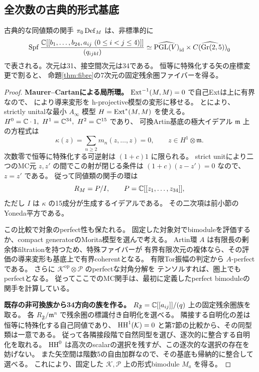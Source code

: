 \subsection{全次数の古典的形式基底}

\begin{theorem}[固定した両ブロック間の全形式gluing変形]\label{thm:full-gluing-base}
古典的な同値類の関手 $\pi_0\operatorname{Def}_M$ は、非標準的に
\[
 \operatorname{Spf}
 \frac{\mathbb C[[b_1,\ldots,b_{24},a_{ij}\ (0\le i<j\le4)]]}
 {(q_{ijkl})}
 \simeq
 \widehat{\operatorname{PGL}(V)}_{\operatorname{id}}
 \times\widehat{C(\operatorname{Gr}(2,5))}_0
\]
で表される。次元は31、接空間次元は34である。
恒等に特殊化する矢の座標変更で割ると、
命題\ref{thm:fibre}の7次元の固定残余圏ファイバーを得る。
\end{theorem}

\begin{proof}
\textbf{Maurer--Cartanによる局所環。}
$\operatorname{Ext}^{-1}(M,M)=0$ で自己Extは上に有界なので、
\cite[Theorem 11.8, Proposition 11.10]{ELOII}により導来変形を
h-projective模型の変形に移せる。
\cite[Proposition 6.1]{ELOI}と\cite[Theorem 7.2]{ELOII}により、
strictly unitalな最小 $A_\infty$ 模型 $H=\operatorname{Ext}^*(M,M)$ を使える。
$H^0=\mathbb C\cdot1,\ H^1=\mathbb C^{34},\ H^2=\mathbb C^{15}$ であり、
可換Artin基底の極大イデアル $\mathfrak m$ 上の方程式は
\[
 \kappa(z)=\sum_{n\ge2}m_n(z,\ldots,z)=0,\qquad
 z\in H^1\otimes\mathfrak m.
\]
次数零で恒等に特殊化する可逆射は $(1+c)1$ に限られる。
strict unitにより二つのMC元 $z,z'$ の間でこの射が閉じる条件は
$(1+c)(z-z')=0$ なので、$z=z'$ である。
従って同値類の関手の環は
\[
 R_M=P/I,\qquad P=\mathbb C[[z_1,\ldots,z_{34}]],
\]
ただし $I$ は $\kappa$ の15成分が生成するイデアルである。
その二次項は前小節のYoneda平方である。

この比較で対象のperfect性も保たれる。
固定した対象対でbimoduleを評価するか、compact generatorのMorita模型を選んで考える。
Artin環 $A$ は有限長の剰余体filtrationを持つため、特殊ファイバーが
有界有限次元の複体なら、その評価の導来変形も基底上で有界coherentとなる。
有限Tor振幅の判定から $A$-perfectである。
さらに $\mathcal K^{\mathrm{op}}\otimes\mathcal P$ のperfectな対角分解を
テンソルすれば、圏上でもperfectとなる。
従ってここでのMC関手は、最初に定義したperfect bimoduleの関手を計算している。

\textbf{既存の非可換族から34方向の族を作る。}
$R_{\mathfrak F}=\mathbb C[[a_{ij}]]/(q)$ 上の固定残余圏族を取る。
各 $R_{\mathfrak F}/\mathfrak m^n$ で残余圏の標識付き自明化を選べる。
隣接する自明化の差は恒等に特殊化する自己同値であり、
$\operatorname{HH}^1(\mathcal K)=0$ と第7節の比較から、その同型類は一意である。
従って各隣接段階で自然同型を選び、逐次的に整合する自明化を取れる。
$\operatorname{HH}^0$ は高次のscalarの選択を残すが、この逐次的な選択の存在を妨げない。
また矢空間は階数5の自由加群なので、その基底も帰納的に整合して選べる。
これにより、固定した $\mathcal K,\mathcal P$ 上の形式bimodule $M_a$ を得る。


\end{proof}

